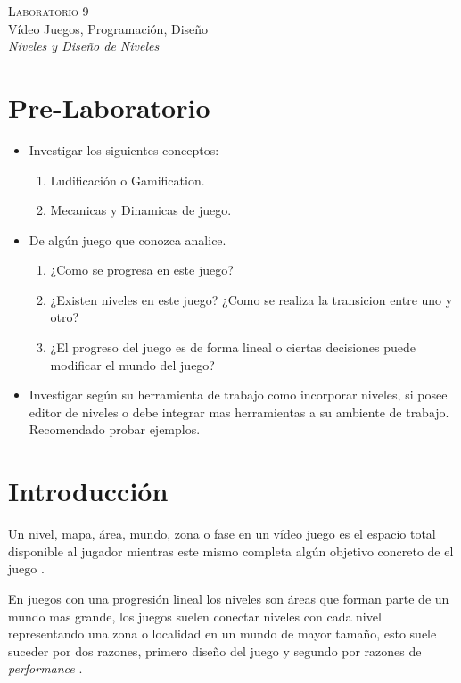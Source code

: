 \begin{center}
\textsc{\Large Laboratorio 9}~\\
{\large Vídeo Juegos, Programación, Diseño}~\\
\emph{Niveles y Diseño de Niveles}
\end{center}

\section{Pre-Laboratorio}
\begin{itemize}
\item Investigar los siguientes conceptos:
\begin{enumerate}
  \item Ludificación o Gamification.
  \item Mecanicas y Dinamicas de juego.
\end{enumerate}
\item De algún juego que conozca analice.
\begin{enumerate}
  \item ¿Como se progresa en este juego?
  \item ¿Existen niveles en este juego? ¿Como se realiza la transicion entre uno y otro?
  \item ¿El progreso del juego es de forma lineal o ciertas decisiones puede modificar el mundo del juego?
\end{enumerate}
\item Investigar según su herramienta de trabajo como incorporar niveles, si posee editor de niveles o debe integrar mas herramientas a su ambiente de trabajo. Recomendado probar ejemplos.
\end{itemize}

\section{Introducción}
Un nivel, mapa, área, mundo, zona o fase en un vídeo juego es el espacio total disponible al jugador  mientras este mismo completa algún objetivo concreto de el juego \cite[p.~107]{bobbatesgamedesign}.

En juegos con una progresión lineal los niveles son áreas que forman parte de un mundo mas grande, los juegos suelen conectar niveles con cada nivel representando una zona o localidad en un mundo de mayor tamaño, esto suele suceder por dos razones, primero diseño del juego y segundo por razones de \emph{performance} \cite[p.~104]{jenkinscreatinggames}.

